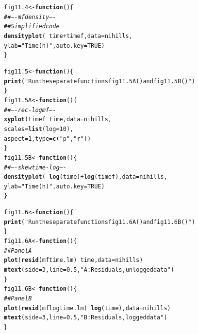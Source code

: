 \documentclass[12pt, a4paper,  BCOR=8.25mm, DIV=15]{scrartcl}\usepackage[]{graphicx}\usepackage[]{color}
\makeatletter
\newcommand{\hlnum}[1]{\textcolor[rgb]{0.686,0.059,0.569}{#1}}%
\newcommand{\hlstr}[1]{\textcolor[rgb]{0.192,0.494,0.8}{#1}}%
\newcommand{\hlcom}[1]{\textcolor[rgb]{0.678,0.584,0.686}{\textit{#1}}}%
\newcommand{\hlopt}[1]{\textcolor[rgb]{0,0,0}{#1}}%
\newcommand{\hlstd}[1]{\textcolor[rgb]{0.345,0.345,0.345}{#1}}%
\newcommand{\hlkwa}[1]{\textcolor[rgb]{0.161,0.373,0.58}{\textbf{#1}}}%
\newcommand{\hlkwb}[1]{\textcolor[rgb]{0.69,0.353,0.396}{#1}}%
\newcommand{\hlkwc}[1]{\textcolor[rgb]{0.333,0.667,0.333}{#1}}%
\newcommand{\hlkwd}[1]{\textcolor[rgb]{0.737,0.353,0.396}{\textbf{#1}}}%
\newenvironment{kframe}{%
 \def\at@end@of@kframe{}%
 \ifinner\ifhmode%
  \def\at@end@of@kframe{\end{minipage}}%
  \begin{minipage}{\columnwidth}%
 \fi\fi%
 \def\FrameCommand##1{\hskip\@totalleftmargin \hskip-\fboxsep
 \colorbox{shadecolor}{##1}\hskip-\fboxsep
     \hskip-\linewidth \hskip-\@totalleftmargin \hskip\columnwidth}%
 \MakeFramed {\advance\hsize-\width
   \@totalleftmargin\z@ \linewidth\hsize
   \@setminipage}}%
 {\par\unskip\endMakeFramed%
 \at@end@of@kframe}
\newenvironment{knitrout}{}{} %
\makeatother
\begin{document}
\begin{knitrout}
\color{fgcolor}\begin{kframe}
\begin{alltt}
\hlstd{fig11.4} \hlkwb{<-} \hlkwa{function}\hlstd{()\{}
\hlcom{## ---- mfdensity ----}
\hlcom{## Simplified code}
\hlkwd{densityplot}\hlstd{(}\hlopt{~} \hlstd{time}\hlopt{+}\hlstd{timef,} \hlkwc{data}\hlstd{=nihills,}
            \hlkwc{ylab}\hlstd{=}\hlstr{"Time (h)"}\hlstd{,} \hlkwc{auto.key}\hlstd{=}\hlnum{TRUE}\hlstd{)}
\hlstd{\}}
\end{alltt}
\end{kframe}
\end{knitrout}

\begin{knitrout}
\color{fgcolor}\begin{kframe}
\begin{alltt}
\hlstd{fig11.5} \hlkwb{<-} \hlkwa{function}\hlstd{()\{}
\hlkwd{print}\hlstd{(}\hlstr{"Run the separate functions fig11.5A() and fig11.5B()"}\hlstd{)}
\hlstd{\}}
\hlstd{fig11.5A} \hlkwb{<-} \hlkwa{function}\hlstd{()\{}
\hlcom{## ---- rec-logmf ----}
\hlkwd{xyplot}\hlstd{(timef}\hlopt{~}\hlstd{time,} \hlkwc{data}\hlstd{=nihills,}
       \hlkwc{scales}\hlstd{=}\hlkwd{list}\hlstd{(}\hlkwc{log}\hlstd{=}\hlnum{10}\hlstd{),}
       \hlkwc{aspect}\hlstd{=}\hlnum{1}\hlstd{,} \hlkwc{type}\hlstd{=}\hlkwd{c}\hlstd{(}\hlstr{"p"}\hlstd{,}\hlstr{"r"}\hlstd{))}
\hlstd{\}}
\hlstd{fig11.5B} \hlkwb{<-} \hlkwa{function}\hlstd{()\{}
\hlcom{## ---- skewtime-log ----}
\hlkwd{densityplot}\hlstd{(}\hlopt{~} \hlkwd{log}\hlstd{(time)}\hlopt{+}\hlkwd{log}\hlstd{(timef),} \hlkwc{data}\hlstd{=nihills,}
           \hlkwc{ylab}\hlstd{=}\hlstr{"Time (h)"}\hlstd{,} \hlkwc{auto.key}\hlstd{=}\hlnum{TRUE}\hlstd{)}
\hlstd{\}}
\end{alltt}
\end{kframe}
\end{knitrout}

\begin{knitrout}
\color{fgcolor}\begin{kframe}
\begin{alltt}
\hlstd{fig11.6} \hlkwb{<-} \hlkwa{function}\hlstd{()\{}
\hlkwd{print}\hlstd{(}\hlstr{"Run the separate functions fig11.6A() and fig11.6B()"}\hlstd{)}
\hlstd{\}}
\hlstd{fig11.6A} \hlkwb{<-} \hlkwa{function}\hlstd{()\{}
\hlcom{## Panel A}
\hlkwd{plot}\hlstd{(}\hlkwd{resid}\hlstd{(mftime.lm)}\hlopt{~}\hlstd{time,} \hlkwc{data}\hlstd{=nihills)}
\hlkwd{mtext}\hlstd{(}\hlkwc{side}\hlstd{=}\hlnum{3}\hlstd{,} \hlkwc{line}\hlstd{=}\hlnum{0.5}\hlstd{,} \hlstr{"A: Residuals, unlogged data"}\hlstd{)}
\hlstd{\}}
\hlstd{fig11.6B} \hlkwb{<-} \hlkwa{function}\hlstd{()\{}
\hlcom{## Panel B}
\hlkwd{plot}\hlstd{(}\hlkwd{resid}\hlstd{(mflogtime.lm)} \hlopt{~} \hlkwd{log}\hlstd{(time),} \hlkwc{data}\hlstd{=nihills)}
\hlkwd{mtext}\hlstd{(}\hlkwc{side}\hlstd{=}\hlnum{3}\hlstd{,} \hlkwc{line}\hlstd{=}\hlnum{0.5}\hlstd{,} \hlstr{"B: Residuals, logged data"}\hlstd{)}
\hlstd{\}}
\end{alltt}
\end{kframe}
\end{knitrout}
\end{document}
